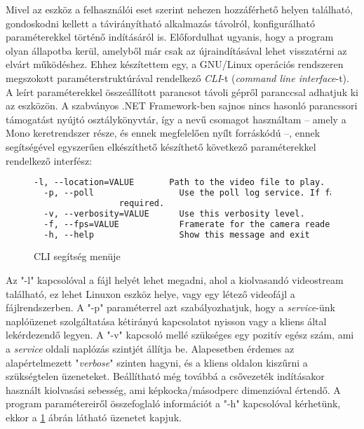 Mivel az eszköz a felhasználói eset szerint nehezen hozzáférhető helyen található, gondoskodni kellett a távirányítható alkalmazás távolról, konfigurálható paraméterekkel történő indításáról is. Előfordulhat ugyanis, hogy a program olyan állapotba kerül, amelyből már csak az újraindításával lehet visszatérni az elvárt működéshez. Ehhez készítettem egy, a GNU/Linux operációs rendszeren megszokott paraméterstruktúrával rendelkező \emph{CLI}-t (\emph{command line interface}-t). A leírt paraméterekkel összeállított parancsot távoli gépről  paranccsal adhatjuk ki az eszközön. A szabványos .NET Framework-ben sajnos nincs hasonló parancssori támogatást nyújtó osztálykönyvtár, így a   nevű csomagot használtam -- amely a Mono keretrendszer része, és ennek megfelelően nyílt forráskódú --, ennek segítségével egyszerűen elkészíthető készíthető következő paraméterekkel rendelkező interfész:

\begin{figure}[h]
\centering
\begin{minipage}{1\textwidth}
\begin{mdframed}[backgroundcolor=gray!20]
\begin{scriptsize}
\begin{lstlisting}[language=xml]
  -l, --location=VALUE       Path to the video file to play.
  -p, --poll                 Use the poll log service. If false, duplex binding is
  			     required.
  -v, --verbosity=VALUE      Use this verbosity level.
  -f, --fps=VALUE            Framerate for the camera reader.
  -h, --help                 Show this message and exit
\end{lstlisting}
\end{scriptsize}
\end{mdframed}
\end{minipage}
\caption{CLI segítség menüje} \label{figure:cli_help}
\end{figure}

Az "-l" kapcsolóval a fájl helyét lehet megadni, ahol a kiolvasandó videostream található, ez lehet Linuxon eszköz helye, vagy egy létező videofájl a fájlrendszerben.
A "-p" paraméterrel azt szabályozhatjuk, hogy a \emph{service}-ünk naplóüzenet szolgáltatása kétirányú kapcsolatot nyisson vagy a kliens által lekérdezendő legyen.
A "-v" kapcsoló mellé szükséges egy pozitív egész szám, ami a \emph{service} oldali naplózás szintjét állítja be. Alapesetben érdemes az alapértelmezett "\emph{verbose}" szinten hagyni, és a kliens oldalon kiszűrni a szükségtelen üzeneteket. 
Beállítható még továbbá a csővezeték indításakor használt kiolvasási sebesség, ami képkocka/másodperc dimenzióval értendő.
A program paramétereiről összefoglaló információt a "-h" kapcsolóval kérhetünk, ekkor a \ref{figure:cli_help} ábrán látható üzenetet kapjuk.

